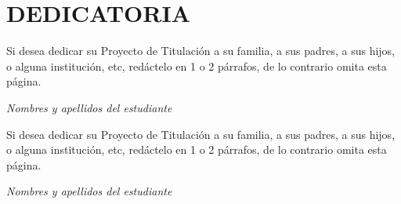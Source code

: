 \documentclass[12pt, a4paper, nofontenc, numbers=endperiod]{apa7}
\begin{document}
	{ %
		\section*{\large \centering DEDICATORIA}
		\vspace*{3cm}
		\begin{flushright}
			\begin{minipage}[b]{7.5cm}
				Si desea dedicar su Proyecto de Titulación a su familia, a sus padres, a sus hijos, o alguna institución, etc, redáctelo en 1 o 2 párrafos, de lo contrario omita esta página. \\ [-1cm]
			\end{minipage}
		\end{flushright}
		\begin{flushright}
			\textit{Nombres y apellidos del estudiante} \\ 
		\end{flushright}
		\vspace*{3cm}
		\begin{flushright}
			\begin{minipage}[b]{7.5cm}	
				{\color{red} Si desea dedicar su Proyecto de Titulación a su familia, a sus padres, a sus hijos, o alguna institución, etc, redáctelo en 1 o 2 párrafos, de lo contrario omita esta página.}
			\end{minipage}
		\end{flushright}
		\begin{flushright}
			\textit{{\color{red}Nombres y apellidos del estudiante}} \\ 
		\end{flushright}
	}
	\newpage
\end{document}
